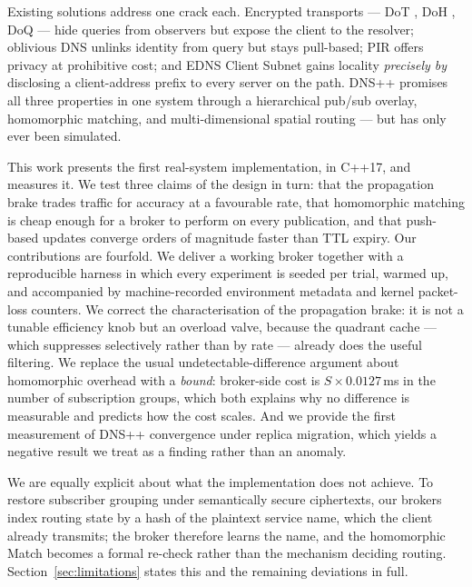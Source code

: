 \documentclass[10pt]{article}
\begin{document}
Existing solutions address one crack each. Encrypted transports --- DoT \citep{hu2016dot}, DoH \citep{hoffman2018doh}, DoQ \citep{huitema2022doq} --- hide queries from observers but expose the client to the resolver; oblivious DNS \citep{schmitt2019odoh,singanamalla2021odoh} unlinks identity from query but stays pull-based; PIR \citep{chor1998pir,bhat2019pir} offers privacy at prohibitive cost; and EDNS Client Subnet \citep{contavalli2016ecs} gains locality \emph{precisely by} disclosing a client-address prefix to every server on the path. DNS++ \citep{rio2026dnspplus} promises all three properties in one system through a hierarchical pub/sub overlay, homomorphic matching, and multi-dimensional spatial routing --- but has only ever been simulated.

This work presents the first real-system implementation, in C++17, and measures it. We test three claims of the design in turn: that the propagation brake trades traffic for accuracy at a favourable rate, that homomorphic matching is cheap enough for a broker to perform on every publication, and that push-based updates converge orders of magnitude faster than TTL expiry. Our contributions are fourfold. We deliver a working broker together with a reproducible harness in which every experiment is seeded per trial, warmed up, and accompanied by machine-recorded environment metadata and kernel packet-loss counters. We correct the characterisation of the propagation brake: it is not a tunable efficiency knob but an overload valve, because the quadrant cache --- which suppresses selectively rather than by rate --- already does the useful filtering. We replace the usual undetectable-difference argument about homomorphic overhead with a \emph{bound}: broker-side cost is $S \times 0.0127$\,ms in the number of subscription groups, which both explains why no difference is measurable and predicts how the cost scales. And we provide the first measurement of DNS++ convergence under replica migration, which yields a negative result we treat as a finding rather than an anomaly.

We are equally explicit about what the implementation does not achieve. To restore subscriber grouping under semantically secure ciphertexts, our brokers index routing state by a hash of the plaintext service name, which the client already transmits; the broker therefore learns the name, and the homomorphic Match becomes a formal re-check rather than the mechanism deciding routing. Section~\ref{sec:limitations} states this and the remaining deviations in full.
\end{document}
